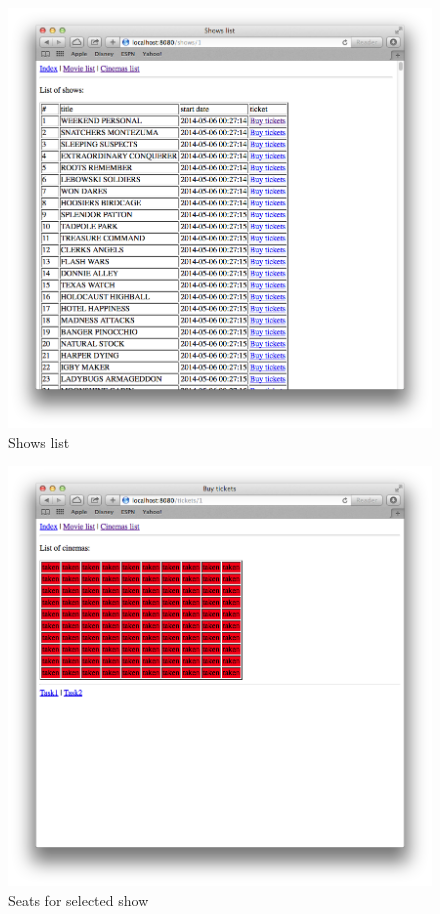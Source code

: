 \documentclass{article}
\begin{document}
\begin{figure}[ht!]
\centering
\includegraphics[width=0.60\columnwidth]{www_ss2} 
\caption{Shows list}
\end{figure}

\begin{figure}[ht!]
\centering
\includegraphics[width=0.60\columnwidth]{www_ss3} 
\caption{Seats for selected show}
\end{figure}
\end{document}
